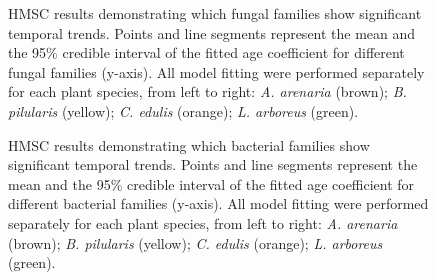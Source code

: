 \newpage
\begin{figure}[h]
	\centering
	\caption[HMSC results demonstrating which fungal families show significant temporal trends.]
		{\hspace{1mm} HMSC results demonstrating which fungal families show significant temporal trends. Points and line segments represent the mean and the 95$\%$ credible interval of the fitted age coefficient for different fungal families (y-axis). All model fitting were performed separately for each plant species, from left to right: \textit{A. arenaria} (brown); \textit{B. pilularis} (yellow); \textit{C. edulis} (orange); \textit{L. arboreus} (green).}
	\label{fig:FunHMSC}
\end{figure}



\newpage
\begin{figure}[h]
	\centering
	\caption[HMSC results demonstrating which bacterial families show significant temporal trends.]
		{\hspace{1mm} HMSC results demonstrating which bacterial families show significant temporal trends. Points and line segments represent the mean and the 95$\%$ credible interval of the fitted age coefficient for different bacterial families (y-axis). All model fitting were performed separately for each plant species, from left to right: \textit{A. arenaria} (brown); \textit{B. pilularis} (yellow); \textit{C. edulis} (orange); \textit{L. arboreus} (green).}
	\label{fig:BacHMSC}
\end{figure}



